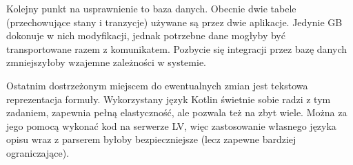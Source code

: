 Kolejny punkt na usprawnienie to baza danych.
Obecnie dwie tabele (przechowujące stany i tranzycje) używane są przez dwie aplikacje.
Jedynie GB dokonuje w nich modyfikacji, jednak potrzebne dane mogłyby być transportowane razem z komunikatem.
Pozbycie się integracji przez bazę danych zmniejszyłoby wzajemne zależności w systemie.

Ostatnim dostrzeżonym miejscem do ewentualnych zmian jest tekstowa reprezentacja formuły.
Wykorzystany język Kotlin świetnie sobie radzi z tym zadaniem, zapewnia pełną elastyczność, ale pozwala też na zbyt wiele.
Można za jego pomocą wykonać kod na serwerze LV, więc zastosowanie własnego języka opisu wraz z parserem byłoby bezpieczniejsze (lecz zapewne bardziej ograniczające).


